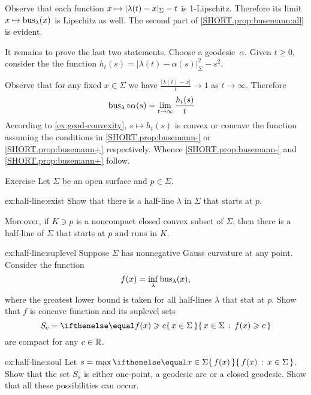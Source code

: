 Observe that each function $x\mapsto \dist{\lambda(t)}{x}{\Sigma}- t$ is 1-Lipschitz.
Therefore its limit $x\mapsto\mathop{\rm bus}\nolimits_\lambda(x)$ is Lipschitz as well.
The second part of \ref{SHORT.prop:busemann:all} is evident.


It remains to prove the last two statements.
Choose a geodesic~$\alpha$.
Given $t\ge 0$, consider the the function $h_t(s)=|{\lambda(t)}-{\alpha(s)}|_{\Sigma}^2-s^2$.


Observe that for any fixed $x\in\Sigma$ we have $\frac{|\lambda(t)-x|}{t}\to 1$ as $t\to\infty$.
Therefore
\begin{align*}
\mathop{\rm bus}\nolimits_\lambda\circ\alpha(s)
&=
\lim_{t\to\infty}\frac{h_t(s)}{t}
\end{align*}
According to \ref{ex:geod-convexity}, 
$s\mapsto h_t(s)$ is convex or concave the function assuming the conditions in  \ref{SHORT.prop:busemann-} or \ref{SHORT.prop:busemann+} respectively.
Whence \ref{SHORT.prop:busemann-} and \ref{SHORT.prop:busemann+} follow.
\qeds

\begin{thm}{Exercise}\label{ex:half-line}
Let $\Sigma$ be an open surface and $p\in\Sigma$.

\begin{subthm}{ex:half-line:exist}
Show that there is a half-line $\lambda$ in $\Sigma$ that starts at $p$.

Moreover, if $K\ni p$ is a noncompact closed convex subset of $\Sigma$, then there is a half-line of $\Sigma$ that starts at $p$ and runs in $K$.
\end{subthm}

\begin{subthm}{ex:half-line:suplevel}
Suppose $\Sigma$ has nonnegative Gauss curvature at any point.
Consider the function
\[f(x)=\inf_\lambda\mathop{\rm bus}\nolimits_\lambda(x),\]
where the greatest lower bound is taken for all half-lines $\lambda$ that stat at $p$.
Show that $f$ is concave function and its suplevel sets 
\[S_c=\set{x\in\Sigma}{f(x)\ge c}\] 
are compact for any $c\in\mathbb{R}$.
\end{subthm}

\begin{subthm}{ex:half-line:soul}
Let $s=\max\set{f(x)}{x\in\Sigma}$.
Show that the set $S_s$ is either one-point, a geodesic arc or a closed geodesic.
Show that all these possibilities can occur.
\end{subthm}



\end{thm}

